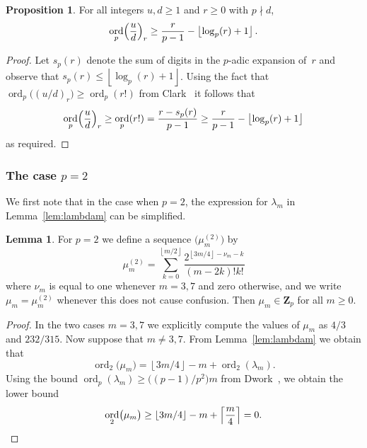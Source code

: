 \documentclass[a4paper,11pt]{article}
\numberwithin{equation}{section}
\providecommand{\floor}[1]{\left\lfloor#1\right\rfloor}   %
\providecommand{\ceil}[1]{\left\lceil#1\right\rceil}   %
\newcommand{\ZZ}{\mathbf{Z}} %
\DeclareMathOperator{\ord}{ord}          %
\theoremstyle{definition}
\newtheorem{lem}[thm]{Lemma}
\newtheorem{prop}[thm]{Proposition}
\begin{document}
\begin{prop} \label{prop:rfac}
For all integers $u, d \geq 1$ and $r \geq 0$ with $p \nmid d$, 
\begin{equation*}
\ord_p\Bigl(\frac{u}{d}\Bigr)_r \geq \frac{r}{p-1} - \floor{\log_p(r) + 1}.
\end{equation*}
\end{prop}

\begin{proof}
Let $s_p(r)$ denote the sum of digits in the $p$-adic expansion of~$r$ 
and observe that $s_p(r) \leq \floor{\log_p(r) + 1}$.  Using the fact that 
$\ord_p\bigl((u/d)_r\bigr) \geq \ord_p(r!)$ from 
Clark~\citep[p.~265]{Clark1966} it follows that 
\begin{equation*}
\ord_p\Bigl(\frac{u}{d}\Bigr)_r \geq \ord_p(r!) = \frac{r - s_p(r)}{p-1} \geq \frac{r}{p-1} - \floor{\log_p(r) + 1}
\end{equation*}
as required.
\end{proof}

\subsubsection{The case $p = 2$}

We first note that in the case when $p = 2$, the expression for 
$\lambda_m$ in Lemma~\ref{lem:lambdam} can be simplified.

\begin{lem} \label{lem:mu2}
For $p = 2$ we define a sequence $\bigl(\mu_m^{(2)}\bigr)$ by 
\begin{equation}
\mu_m^{(2)} = 
    \sum_{k=0}^{\floor{m/2}} \frac{2^{\floor{3m/4} - \nu_m - k}}{(m-2k)! k!}
\end{equation}
where $\nu_m$ is equal to one whenever $m = 3, 7$ and zero otherwise, 
and we write $\mu_m =\mu_m^{(2)}$ whenever this does not cause confusion. 
Then $\mu_m \in \ZZ_p$ for all $m \geq 0$.
\end{lem}

\begin{proof}
In the two cases $m = 3, 7$ we explicitly compute the values of 
$\mu_m$ as $4/3$ and $232/315$.  Now suppose that $m \neq 3, 7$. 
From Lemma~\ref{lem:lambdam} we obtain that 
\begin{equation*}
\ord_2 \bigl(\mu_m\bigr) 
    = \floor{3m/4} - m + \ord_2(\lambda_m).
\end{equation*}
Using the bound $\ord_p(\lambda_m) \geq \bigl((p-1)/p^2\bigr) m$ from 
Dwork~\citep[pp.~55--57]{Dwork1962}, we obtain the lower bound 
\begin{equation*}
\ord_2 \bigl(\mu_m\bigr) 
    \geq \floor{3m/4} - m + \ceil{\frac{m}{4}} = 0. \qedhere
\end{equation*}
\end{proof}
\end{document}
